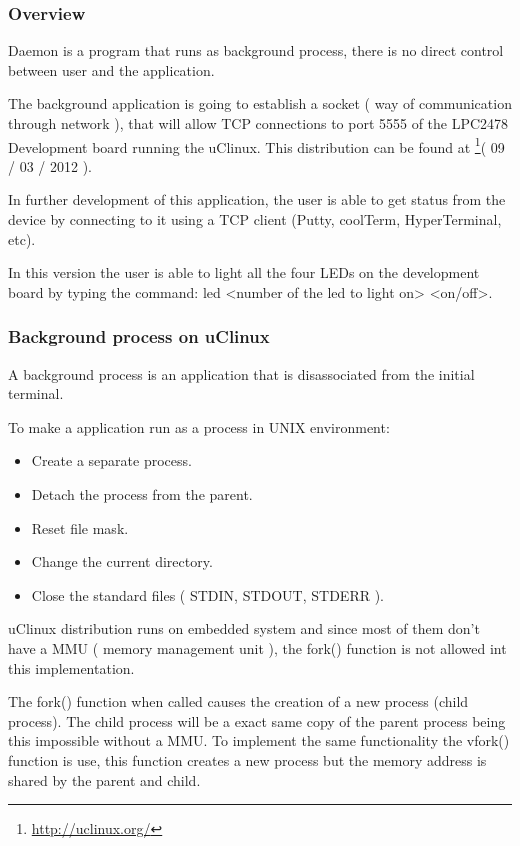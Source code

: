 \subsubsection{Overview}
Daemon is a program that runs as background process, there is no direct control between user and the application.

The background application is going to establish a socket ( way of communication through network ), that will allow TCP connections to port 5555 of the LPC2478 Development board running the uClinux. This distribution can be found at \footnote{\url{http://uclinux.org/}}( 09 / 03 / 2012 ).

In further development of this application, the user is able to get status from the device by connecting to it using a TCP client (Putty, coolTerm, HyperTerminal, etc).

In this version the user is able to light all the four LEDs on the development board by typing the command: led <number of the led to light on> <on/off>.

\subsubsection{Background process on uClinux}
A background process is an application that is disassociated from the initial terminal. 

To make a application run as a process in UNIX environment:

\begin{itemize}
	\item Create a separate process.
	\item Detach the process from the parent.
	\item Reset file mask.
	\item Change the current directory.
	\item Close the standard files ( STDIN, STDOUT, STDERR ).
\end{itemize}

uClinux distribution runs on embedded system and since most of them don't have a MMU ( memory management unit ), the fork() function is not allowed int this implementation.

The fork() function when called causes the creation of a new process (child process). The child process will be a exact same copy of the parent process being this impossible without a MMU.
To implement the same functionality the vfork() function is use, this function creates a new process but the memory address is shared by the parent and child.

